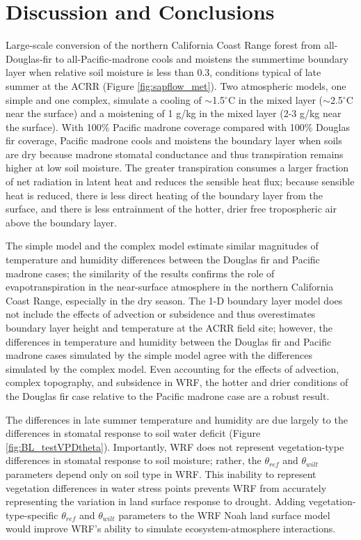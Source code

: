 \section{Discussion and Conclusions}

Large-scale conversion of the northern California Coast Range forest from all-Douglas-fir to all-Pacific-madrone cools and moistens the summertime boundary layer when relative soil moisture is less than 0.3, conditions typical of late summer at the ACRR (Figure \ref{fig:sapflow_met}).   Two atmospheric models, one simple and one complex, simulate a cooling of $\sim$1.5$^\circ$C in the mixed layer ($\sim$2.5$^\circ$C near the surface) and a moistening of 1 g/kg in the mixed layer (2-3 g/kg near the surface).  With 100\% Pacific madrone coverage compared with 100\% Douglas fir coverage, Pacific madrone cools and moistens the boundary layer when soils are dry because madrone stomatal conductance and thus transpiration remains higher at low soil moisture.  The greater transpiration consumes a larger fraction of net radiation in latent heat and reduces the sensible heat flux; because sensible heat is reduced, there is less direct heating of the boundary layer from the surface, and there is less entrainment of the hotter, drier free tropospheric air above the boundary layer.

The simple model and the complex model estimate similar magnitudes of temperature and humidity differences between the Douglas fir and Pacific madrone cases; the similarity of the results confirms the role of evapotranspiration in the near-surface atmosphere in the northern California Coast Range, especially in the dry season.  The 1-D boundary layer model does not include the effects of advection or subsidence and thus overestimates boundary layer height and temperature at the ACRR field site; however, the differences in temperature and humidity between the Douglas fir and Pacific madrone cases simulated by the simple model agree with the differences simulated by the complex model.  Even accounting for the effects of advection, complex topography, and subsidence in WRF, the hotter and drier conditions of the Douglas fir case relative to the Pacific madrone case are a robust result.

The differences in late summer temperature and humidity are due largely to the differences in stomatal response to soil water deficit (Figure \ref{fig:BL_testVPDtheta}).  Importantly, WRF does not represent vegetation-type differences in stomatal response to soil moisture; rather, the $\theta_{ref}$ and $\theta_{wilt}$ parameters depend only on soil type in WRF.  This inability to represent vegetation differences in water stress points prevents WRF from accurately representing the variation in land surface response to drought.  Adding vegetation-type-specific $\theta_{ref}$ and $\theta_{wilt}$ parameters to the WRF Noah land surface model would improve WRF's ability to simulate ecosystem-atmosphere interactions.

